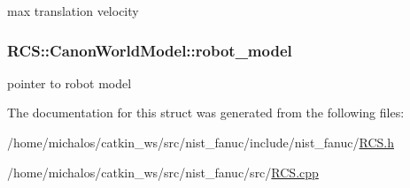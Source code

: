 max translation velocity \hypertarget{structRCS_1_1CanonWorldModel_a185c2b5e3eaba715be4d49b47879574c}{
\subsubsection[{robot\-\_\-model}]{ R\-C\-S\-::\-Canon\-World\-Model\-::robot\-\_\-model}}\label{structRCS_1_1CanonWorldModel_a185c2b5e3eaba715be4d49b47879574c}
pointer to robot model 

The documentation for this struct was generated from the following files\-:\begin{DoxyCompactItemize}
\item 
/home/michalos/catkin\-\_\-ws/src/nist\-\_\-fanuc/include/nist\-\_\-fanuc/\hyperlink{RCS_8h}{R\-C\-S.\-h}\item 
/home/michalos/catkin\-\_\-ws/src/nist\-\_\-fanuc/src/\hyperlink{RCS_8cpp}{R\-C\-S.\-cpp}\end{DoxyCompactItemize}
